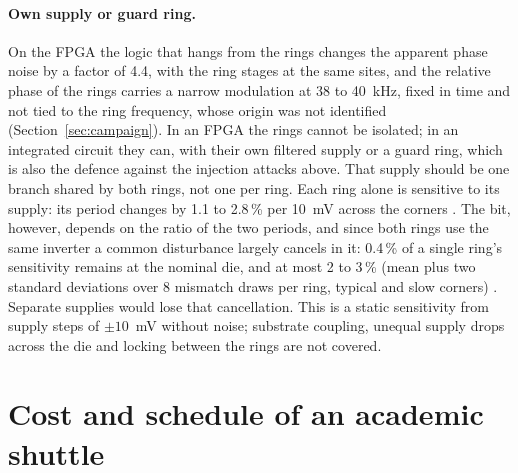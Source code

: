 \paragraph{Own supply or guard ring.} On the \ac{FPGA} the logic that
hangs from the rings changes the apparent phase noise by a factor of
4.4, with the ring stages at the same sites, and the relative phase of
the rings carries a narrow modulation at 38 to 40~kHz, fixed in time and
not tied to the ring frequency, whose origin was not identified \meas{}
(Section~\ref{sec:campaign}). In an \ac{FPGA} the rings cannot be
isolated; in an integrated circuit they can, with their own filtered
supply or a guard ring, which is also the defence against the injection
attacks above. That supply should be one branch shared by both rings,
not one per ring. Each ring alone is sensitive to its supply: its period
changes by 1.1 to 2.8\,\% per 10~mV across the corners \simu{}. The bit,
however, depends on the ratio of the two periods, and since both rings
use the same inverter a common disturbance largely cancels in it: 0.4\,\%
of a single ring's sensitivity remains at the nominal die, and at most
2 to 3\,\% (mean plus two standard deviations over 8 mismatch draws per
ring, typical and slow corners) \simu{}. Separate supplies would lose that
cancellation. This is a static sensitivity from supply steps of
$\pm10$~mV without noise; substrate coupling, unequal supply drops across
the die and locking between the rings are not covered.

\section{Cost and schedule of an academic shuttle}
\label{sec:shuttle}

